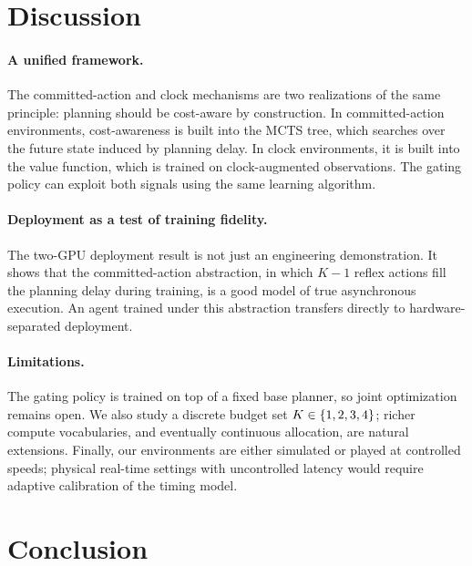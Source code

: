 \section{Discussion}


\paragraph{A unified framework.}
The committed-action and clock mechanisms are two realizations of the
same principle: planning should be cost-aware by construction. In
committed-action environments, cost-awareness is built into the MCTS
tree, which searches over the future state induced by planning delay. In
clock environments, it is built into the value function, which is
trained on clock-augmented observations.
The gating policy can exploit both signals using the same learning algorithm.

\paragraph{Deployment as a test of training fidelity.}
The two-GPU deployment result is not just an engineering demonstration.
It shows that the committed-action abstraction, in which $K{-}1$ reflex
actions fill the planning delay during training, is a good model of
true asynchronous execution. An agent trained under this abstraction
transfers directly to hardware-separated deployment.

\paragraph{Limitations.}
The gating policy is trained on top of a fixed base planner, so joint
optimization remains open. We also study a discrete budget set
$K \in \{1,2,3,4\}$; richer compute vocabularies, and eventually continuous
allocation, are natural extensions. Finally, our environments are
either simulated or played at controlled speeds; physical real-time
settings with uncontrolled latency would require adaptive calibration of
the timing model.


\section{Conclusion}

